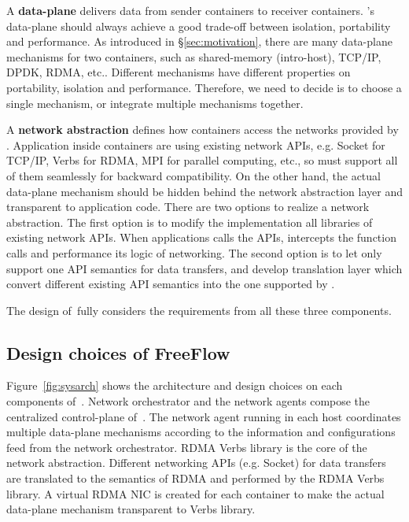 A \textbf{data-plane} delivers data from sender containers to receiver 
containers. \sysname's data-plane should always achieve a good trade-off
between isolation, portability and performance. 
As introduced in \S\ref{sec:motivation}, there are many data-plane mechanisms
for two containers, such as shared-memory (intro-host), TCP/IP, DPDK, RDMA, etc..
Different mechanisms have different properties on portability, isolation and 
performance. Therefore, we need to decide is to choose a single mechanism, or
integrate multiple mechanisms together.

A \textbf{network abstraction} defines how containers access the networks
provided by \sysname. Application inside containers are using existing 
network APIs, e.g. Socket for TCP/IP, Verbs for RDMA, MPI for parallel computing, etc., so \sysname must support all of them seamlessly for 
backward compatibility. On the other hand, the actual data-plane mechanism
should be hidden behind the network abstraction layer and transparent to 
application code. There are two options to realize a network abstraction.
The first option is to modify the implementation all libraries of existing
network APIs. When applications calls the APIs, \sysname intercepts
the function calls and performance its logic of networking. 
The second option is to let \sysname only support one API semantics for
data transfers, and develop translation layer which convert different
existing API semantics into the one supported by \sysname.

The design of~\sysname fully considers the requirements from all these three
components.

\subsection{Design choices of FreeFlow}

Figure~\ref{fig:sysarch} shows the architecture and design choices on each 
components of~\sysname. Network orchestrator and the network agents compose 
the centralized control-plane of~\sysname. The network agent running in each 
host coordinates multiple data-plane mechanisms according to the information and 
configurations feed from the network orchestrator. RDMA Verbs library is the core
of the network abstraction. Different networking APIs (e.g. Socket) for data
transfers are translated to the semantics of RDMA and performed by the RDMA
Verbs library. A virtual RDMA NIC is created for each container to make the
actual data-plane mechanism transparent to Verbs library.

